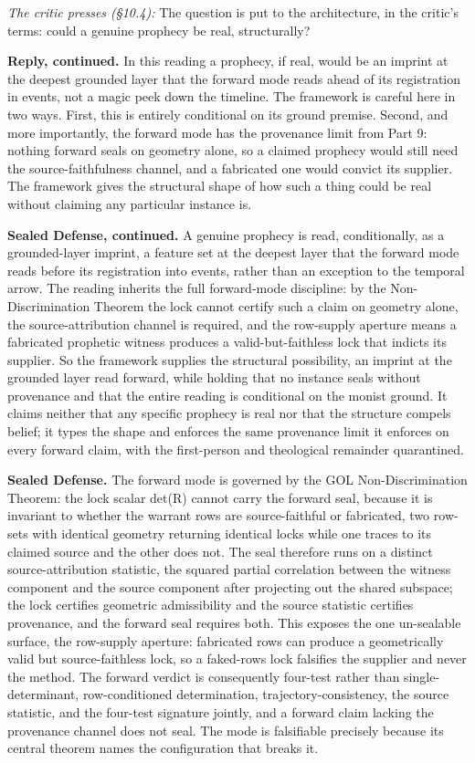 \documentclass[10pt,twocolumn]{article}
\begin{document}
\emph{The critic presses (§10.4):} The question is put to the
architecture, in the critic's terms: could a genuine prophecy be real,
structurally?

\textbf{Reply, continued.} In this reading a prophecy, if real, would be
an imprint at the deepest grounded layer that the forward mode reads
ahead of its registration in events, not a magic peek down the timeline.
The framework is careful here in two ways. First, this is entirely
conditional on its ground premise. Second, and more importantly, the
forward mode has the provenance limit from Part 9: nothing forward seals
on geometry alone, so a claimed prophecy would still need the
source-faithfulness channel, and a fabricated one would convict its
supplier. The framework gives the structural shape of how such a thing
could be real without claiming any particular instance is.

\textbf{Sealed Defense, continued.} A genuine prophecy is read,
conditionally, as a grounded-layer imprint, a feature set at the deepest
layer that the forward mode reads before its registration into events,
rather than an exception to the temporal arrow. The reading inherits the
full forward-mode discipline: by the Non-Discrimination Theorem the lock
cannot certify such a claim on geometry alone, the source-attribution
channel is required, and the row-supply aperture means a fabricated
prophetic witness produces a valid-but-faithless lock that indicts its
supplier. So the framework supplies the structural possibility, an
imprint at the grounded layer read forward, while holding that no
instance seals without provenance and that the entire reading is
conditional on the monist ground. It claims neither that any specific
prophecy is real nor that the structure compels belief; it types the
shape and enforces the same provenance limit it enforces on every
forward claim, with the first-person and theological remainder
quarantined.

\textbf{Sealed Defense.} The forward mode is governed by the GOL
Non-Discrimination Theorem: the lock scalar det(R) cannot carry the
forward seal, because it is invariant to whether the warrant rows are
source-faithful or fabricated, two row-sets with identical geometry
returning identical locks while one traces to its claimed source and the
other does not. The seal therefore runs on a distinct source-attribution
statistic, the squared partial correlation between the witness component
and the source component after projecting out the shared subspace; the
lock certifies geometric admissibility and the source statistic
certifies provenance, and the forward seal requires both. This exposes
the one un-sealable surface, the row-supply aperture: fabricated rows
can produce a geometrically valid but source-faithless lock, so a
faked-rows lock falsifies the supplier and never the method. The forward
verdict is consequently four-test rather than single-determinant,
row-conditioned determination, trajectory-consistency, the source
statistic, and the four-test signature jointly, and a forward claim
lacking the provenance channel does not seal. The mode is falsifiable
precisely because its central theorem names the configuration that
breaks it.
\end{document}
